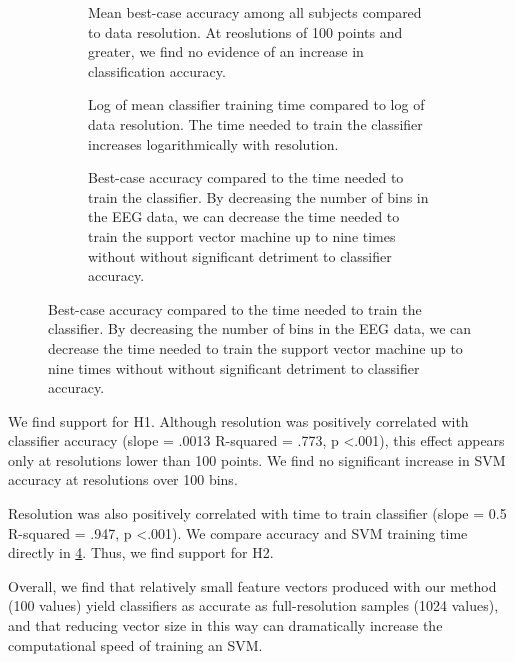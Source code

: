 \begin{figure}

\begin{subfigure}%
   {}
  \caption{Mean best-case accuracy among all subjects compared to data resolution. At reoslutions of 100 points and greater, we find no evidence of an increase in classification accuracy. }
  \label{fig:fig1a}
 \end{subfigure}

 \begin{subfigure}[b]%
   {}
  \caption{Log of mean classifier training time compared to log of data resolution. The time needed to train the classifier increases logarithmically with resolution.}
  \label{fig:fig1b}
 \end{subfigure}

 \begin{subfigure}%
   {}
  \caption{ Best-case accuracy compared to the time needed to train the classifier. By decreasing the number of bins in the EEG data, we can decrease the time needed to train the support vector machine up to nine times without without significant detriment to classifier accuracy. }
  \label{fig:fig1c}
 \end{subfigure}

 \end{figure}

We find support for H1. Although resolution was positively correlated with classifier accuracy (slope = .0013 R-squared = .773, p \textless .001), this effect appears only at resolutions lower than 100 points. We find no significant increase in SVM accuracy at resolutions over 100 bins. 

Resolution was also positively correlated with time to train classifier (slope = 0.5 R-squared = .947, p \textless .001). We compare accuracy and SVM training time directly in \ref{fig:fig1c}. Thus, we find support for H2.

Overall, we find that relatively small feature vectors produced with our method (100 values) yield classifiers as accurate as full-resolution samples (1024 values), and that reducing vector size in this way can dramatically increase the computational speed of training an SVM. 